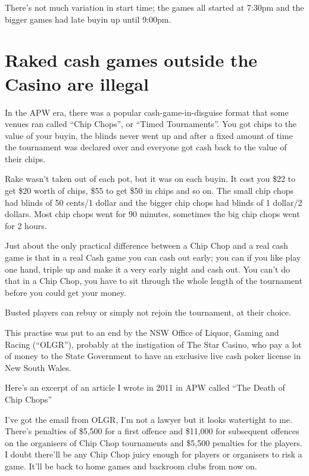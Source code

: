There's not much variation in start time; the games all started
at 7:30pm and the bigger games had late buyin up until 9:00pm.

\section{Raked cash games outside the Casino are illegal}

In the APW era, there was a popular
cash-game-in-disguise format that some venues ran
called ``Chip Chops'', or ``Timed Tournaments''.
You got chips to the value of
your buyin, the blinds never went up and after a fixed
amount of time the tournament was declared over and
everyone got cash back to the value of their chips.

Rake wasn't taken out of each pot, but it was on each buyin.
It cost you \$22 to get \$20 worth of chips, \$55 to get
\$50 in chips and so on. The small chip chops had blinds of
50 cents/1 dollar and the bigger chip chops had blinds of
1 dollar/2 dollars. Most chip chops went for 90 minutes,
sometimes the big chip chops went for 2 hours.

Just about the only practical difference between a
Chip Chop and a real cash game is that in a real Cash game
you can cash out early; you can if you like play one hand,
triple up and make it a very early night and cash out.
You can't do that in a Chip Chop, you have to sit through
the whole length of the tournament before you could get your money.

Busted players can rebuy or simply not rejoin the tournament,
at their choice.

This practise was put to an end by the NSW Office of Liquor,
Gaming and Racing (``OLGR''), probably at the instigation of The Star Casino,
who pay a lot of money to the State Government to
have an exclusive live cash poker license in New South Wales.

Here's an excerpt of an article I wrote in 2011 in APW called
``The Death of Chip Chops''


I've got the email from OLGR, I'm not a lawyer but it looks watertight
to me. There's penalties of \$5,500 for a first offence and \$11,000 for
subsequent offences on the organisers of Chip Chop tournaments and
\$5,500 penalties for the players. I doubt there'll be any Chip Chop
juicy enough for players or organisers to risk a game. It'll be back
to home games and backroom clubs from now on.

